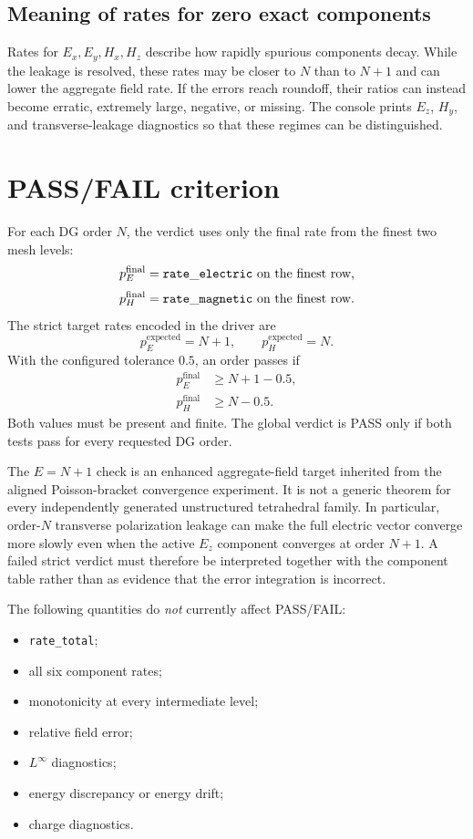 \documentclass[11pt]{article}
\newcommand{\code}[1]{\nolinkurl{#1}}
\newcommand{\mcode}[1]{\mathtt{\detokenize{#1}}}
\begin{document}
\subsection{Meaning of rates for zero exact components}

Rates for \(E_x,E_y,H_x,H_z\) describe how rapidly spurious components decay.
While the leakage is resolved, these rates may be closer to \(N\) than to
\(N+1\) and can lower the aggregate field rate. If the errors reach roundoff,
their ratios can instead become erratic, extremely large, negative, or
missing. The console prints \(E_z\), \(H_y\), and transverse-leakage
diagnostics so that these regimes can be distinguished.

\section{PASS/FAIL criterion}

For each DG order \(N\), the verdict uses only the final rate from the finest
two mesh levels:
\[
  p_E^{\mathrm{final}}
  =\mcode{rate_electric}\text{ on the finest row},
\]
\[
  p_H^{\mathrm{final}}
  =\mcode{rate_magnetic}\text{ on the finest row}.
\]
The strict target rates encoded in the driver are
\[
  p_E^{\mathrm{expected}}=N+1,
  \qquad
  p_H^{\mathrm{expected}}=N.
\]
With the configured tolerance \(0.5\), an order passes if
\begin{align}
  p_E^{\mathrm{final}}&\ge N+1-0.5,\\
  p_H^{\mathrm{final}}&\ge N-0.5.
\end{align}
Both values must be present and finite. The global verdict is PASS only if
both tests pass for every requested DG order.

The \(E=N+1\) check is an enhanced aggregate-field target inherited from the
aligned Poisson-bracket convergence experiment. It is not a generic theorem
for every independently generated unstructured tetrahedral family. In
particular, order-\(N\) transverse polarization leakage can make the full
electric vector converge more slowly even when the active \(E_z\) component
converges at order \(N+1\). A failed strict verdict must therefore be
interpreted together with the component table rather than as evidence that
the error integration is incorrect.

The following quantities do \emph{not} currently affect PASS/FAIL:
\begin{itemize}[leftmargin=*]
  \item \code{rate_total};
  \item all six component rates;
  \item monotonicity at every intermediate level;
  \item relative field error;
  \item \(L^\infty\) diagnostics;
  \item energy discrepancy or energy drift;
  \item charge diagnostics.
\end{itemize}
\end{document}
